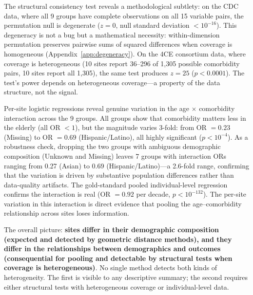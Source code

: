 \documentclass{article}
\begin{document}
The structural consistency test reveals a methodological subtlety: on the
CDC data, where all 9 groups have complete observations on all 15 variable
pairs, the permutation null is degenerate ($z = 0$, null standard deviation $< 10^{-16}$).  This degeneracy is not a bug but a mathematical necessity: within-dimension permutation preserves pairwise sums of squared differences when coverage is homogeneous (Appendix~\ref{app:degeneracy}).
On the 4CE consortium data, where coverage
is heterogeneous (10 sites report 36--296 of 1,305 possible comorbidity
pairs, 10 sites report all 1,305), the same test produces $z = 25$ ($p <
0.0001$).  The test's power depends on heterogeneous coverage---a property
of the data structure, not the signal.

Per-site logistic regressions reveal genuine variation in the
age $\times$ comorbidity interaction across the 9 groups.  All groups show that
comorbidity matters less in the elderly (all OR $< 1$), but the magnitude
varies 3-fold: from OR $= 0.23$ (Missing) to OR $= 0.69$ (Hispanic/Latino),
all highly significant ($p < 10^{-4}$).  As a robustness check, dropping the two groups with ambiguous demographic composition (Unknown and Missing) leaves 7 groups with interaction ORs ranging from 0.27 (Asian) to 0.69 (Hispanic/Latino)---a 2.6-fold range, confirming that the variation is driven by substantive population differences rather than data-quality artifacts.
The gold-standard pooled
individual-level regression confirms the interaction is real (OR $= 0.92$ per
decade, $p < 10^{-132}$).  The per-site variation in this interaction is
direct evidence that pooling the age--comorbidity relationship across sites
loses information.

The overall picture: \textbf{sites differ in their demographic
composition (expected and detected by geometric distance methods), and they
differ in the relationships between demographics and outcomes (consequential
for pooling and detectable by structural tests when coverage is
heterogeneous)}.  No single method detects both kinds of heterogeneity.
The first is visible to any descriptive summary; the second requires either
structural tests with heterogeneous coverage or individual-level data.
\end{document}
